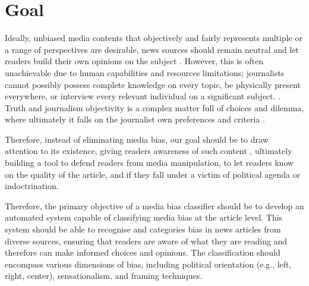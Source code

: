 \section{Goal}

Ideally, unbiased media contents that objectively and fairly represents multiple or a range of perspectives are desirable, news sources should remain neutral and let readers build their own opinions on the subject \cite{reuters-2021-digital-news-report}. However, this is often unachievable due to human capabilities and resources limitations; journalists cannot possibly possess complete knowledge on every topic, be physically present everywhere, or interview every relevant individual on a significant subject. \cite{allsides-2022-bias-definition}. Truth and journalism objectivity is a complex matter full of choices and dilemma, where ultimately it falls on the journalist own preferences and criteria \cite{boudana-2011-journalistic-objectivity}.

Therefore, instead of eliminating media bias, our goal should be to draw attention to its existence, giving readers awareness of such content \cite{spinde-2024-taxonomy}, ultimately building a tool to defend readers from media manipulation, to let readers know on the quality of the article, and if they fall under a victim of political agenda or indoctrination.

Therefore, the primary objective of a media bias classifier should be to develop an automated system capable of classifying media bias at the article level. This system should be able to recognise and categories bias in news articles from diverse sources, ensuring that readers are aware of what they are reading and therefore can make informed choices and opinions. The classification should encompass various dimensions of bias, including political orientation (e.g., left, right, center), sensationalism, and framing techniques.

